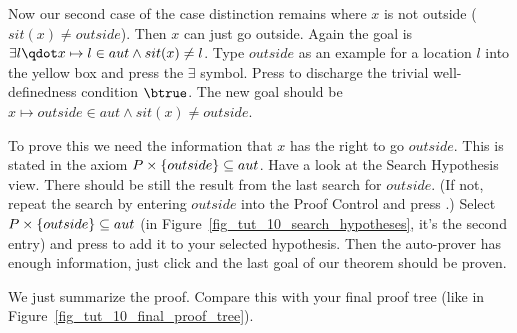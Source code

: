 Now our second case of the case distinction remains where $x$ is not outside ($sit(x)\neq outside$). Then $x$ can just go outside.
Again the goal is $\exists l\qdot x\mapsto l\in aut \land sit(x)\neq l$. Type
$outside$ as an example for a location $l$ into the yellow box and press
the $\exists$ symbol.
Press   to discharge the trivial well-definedness condition $\btrue$.
The new goal should be $x \mapsto outside\in aut \land sit(x)\neq outside$.

To prove this we need the information that $x$ has the right to go $outside$.
This is stated in the axiom $P \mathbin\times\{outside\}\subseteq aut$.
Have a look at the \textsf{Search Hypothesis} view. There should be still the result from the last search for $outside$.
(If not, repeat the search by entering $outside$ into the \textsf{Proof Control} and press .)
Select $P \mathbin\times\{outside\}\subseteq aut$ (in Figure~\ref{fig_tut_10_search_hypotheses}, it's the second entry) and
  press  to add it to your selected hypothesis.
Then the auto-prover has enough information, just click  and
  the last goal of our theorem should be proven.

We just summarize the proof. Compare this with your final proof tree (like in 
Figure~\ref{fig_tut_10_final_proof_tree}).

